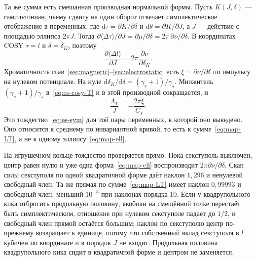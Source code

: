 Та же сумма есть смешанная производная нормальной формы. Пусть $K(J,\delta)$ --- гамильтониан, чьему сдвигу на один оборот отвечает симплектическое отображение в переменных, где $\mathrm{d}\tau=\partial K/\partial\delta$ и $\mathrm{d}\theta=\partial K/\partial J$, а $J$ --- действие с площадью эллипса $2\pi J$. Тогда $\partial\langle\Delta\tau\rangle/\partial J=\partial\mu/\partial\delta=2\pi\,\partial\nu/\partial\delta$. В координатах COSY $\tau=l$ и $\delta=\delta_K$, поэтому
\begin{equation}
\label{eq:map-id}
\frac{\partial\langle\Delta l\rangle}{\partial J}
=
2\pi\frac{\partial\nu}{\partial\delta_K}.
\end{equation}
Хроматичность глав~\ref{sec:magnetic}--\ref{sec:electrostatic} есть $\xi=\partial\nu/\partial\delta$ по импульсу на нулевом потенциале. На нуле $\mathrm{d}\delta_K/\mathrm{d}\delta=(\gamma_s+1)/\gamma_s$. Множитель $(\gamma_s+1)/\gamma_s$ в~\eqref{eq:es-cosy-T} и в этой производной сокращается, и
\begin{equation}
\label{eq:map-xi}
\frac{\Lambda_T}{J}
=
-\frac{2\pi\xi}{C_s}.
\end{equation}
Это тождество~\eqref{eq:es-sym} для той пары переменных, в которой оно выведено. Оно относится к среднему по инвариантной кривой, то есть к сумме~\eqref{eq:map-LT}, а не к одному эллипсу~\eqref{eq:map-ell}.

На игрушечном кольце тождество проверяется прямо. Пока секступоль выключен, центр равен нулю и уже одна форма~\eqref{eq:map-ell} воспроизводит $2\pi\partial\nu/\partial\delta$. Скан силы секступоля по одной квадратичной форме даёт наклон $1{,}296$ и ненулевой свободный член. Та же прямая по сумме~\eqref{eq:map-LT} имеет наклон $0{,}99993$ и свободный член, меньший $10^{-3}$ при наклонах порядка $10$. Если у квадрупольного кика отбросить продольную половину, якобиан на смещённой точке перестаёт быть симплектическим, отношение при нулевом секступоле падает до $1/2$, и свободный член прямой остаётся большим; наклон по секступолю центр по-прежнему возвращает к единице, потому что собственный вклад секступоля в $l$ кубичен по координате и в порядок $J$ не входит. Продольная половина квадрупольного кика сидит в квадратичной форме и центром не заменяется.

